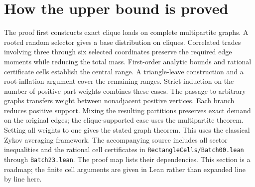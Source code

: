 \documentclass[11pt]{article}
\begin{document}
\section{How the upper bound is proved}
The proof first constructs exact clique loads on complete multipartite graphs. A rooted random selector gives a base distribution on cliques. Correlated trades involving three through six selected coordinates preserve the required edge moments while reducing the total mass. First-order analytic bounds and rational certificate cells establish the central range. A triangle-leave construction and a root-inflation argument cover the remaining ranges. Strict induction on the number of positive part weights combines these cases.
The passage to arbitrary graphs transfers weight between nonadjacent positive vertices. Each branch reduces positive support. Mixing the resulting partitions preserves exact demand on the original edges; the clique-supported case uses the multipartite theorem. Setting all weights to one gives the stated graph theorem. This uses the classical Zykov averaging framework. The accompanying source includes all sector inequalities and the rational cell certificates in \texttt{RectangleCells/Batch00.lean} through \texttt{Batch23.lean}. The proof map lists their dependencies. This section is a roadmap; the finite cell arguments are given in Lean rather than expanded line by line here.
\end{document}
